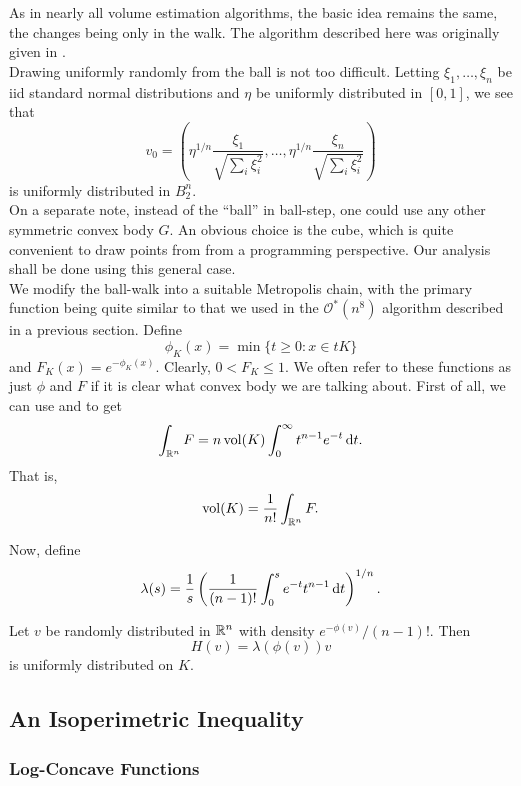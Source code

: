 As in nearly all volume estimation algorithms, the basic idea remains the same, the changes being only in the walk. The algorithm described here was originally given in \cite{lov-sim-on7}.\\
Drawing uniformly randomly from the ball is not too difficult. Letting $\xi_1,\ldots,\xi_n$ be iid standard normal distributions and $\eta$ be uniformly distributed in $[0,1]$, we see that
\[ v_0 = \left( \eta^{1/n} \frac{\xi_1}{\sqrt{\sum_i \xi_i^2}}, \ldots, \eta^{1/n} \frac{\xi_n}{\sqrt{\sum_i \xi_i^2}} \right) \]
is uniformly distributed in $B_2^n$.\\
On a separate note, instead of the ``ball'' in ball-step, one could use any other symmetric convex body $G$. An obvious choice is the cube, which is quite convenient to draw points from from a programming perspective. Our analysis shall be done using this general case.\\

We modify the ball-walk into a suitable Metropolis chain, with the primary function being quite similar to that we used in the $\mathcal{O}^*(n^8)$ algorithm described in a previous section. Define
\[ \phi_K(x) = \min\{t\geq 0 : x\in tK\} \]
and $F_K(x)=e^{-\phi_K(x)}$. Clearly, $0<F_K \leq 1$. We often refer to these functions as just $\phi$ and $F$ if it is clear what convex body we are talking about. First of all, we can use  and  to get
\[ \int_{\mathbb{R}^n} F = n\operatorname{vol}(K)\int_0^\infty t^{n-1}e^{-t}\operatorname{d}\!{t}. \]
That is,
\begin{equation}
    \operatorname{vol}(K) = \frac{1}{n!} \int_{\mathbb{R}^n} F.
\end{equation}

Now, define
\[ \lambda(s) = \frac{1}{s}\left(\frac{1}{(n-1)!}\int_0^s e^{-t}t^{n-1}\operatorname{d}\!{t}\right)^{1/n}. \]
\begin{lemma}
    Let $v$ be randomly distributed in $\mathbb{R}^n$ with density $e^{-\phi(v)}/(n-1)!$. Then
    \[ H(v) = \lambda(\phi(v))v \]
    is uniformly distributed on $K$.
\end{lemma}


\subsection{An Isoperimetric Inequality}

\subsubsection{Log-Concave Functions}

